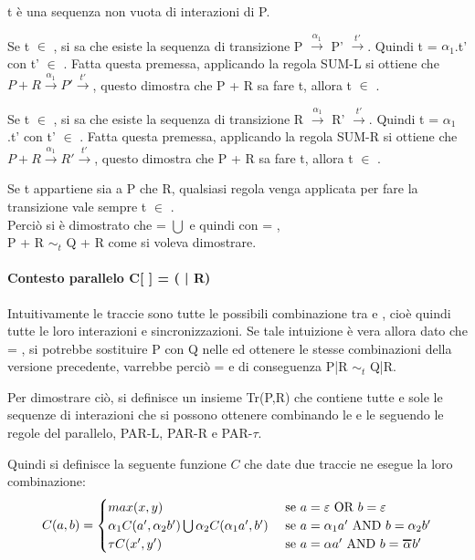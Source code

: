 t è una sequenza non vuota di interazioni di P.

Se t $\in$ , si sa che esiste la sequenza di transizione P $\overset{\alpha_{1}}\rightarrow$ P' $\overset{t'}\rightarrow$. Quindi t = $\alpha_{1}$.t' con t' $\in$ . Fatta questa premessa, applicando la regola SUM-L si ottiene che $P + R \overset{\alpha_{1}}\rightarrow P'\overset{t'}\rightarrow$, questo dimostra che P + R sa fare t, allora t $\in$ .

Se t $\in$ , si sa che esiste la sequenza di transizione R $\overset{\alpha_{1}}\rightarrow$ R' $\overset{t'}\rightarrow$. Quindi t = $\alpha_{1}$.t' con t' $\in$ . Fatta questa premessa, applicando la regola SUM-R si ottiene che $P + R \overset{\alpha_{1}}\rightarrow R'\overset{t'}\rightarrow$, questo dimostra che P + R sa fare t, allora t $\in$ .

Se t appartiene sia a P che R, qualsiasi regola venga applicata per fare la transizione vale sempre t $\in$ .\\

Perciò si è dimostrato che  =  $\bigcup$  e quindi con  = ,\\ P + R $\sim_{t}$ Q + R come si voleva dimostrare.

\paragraph{Contesto parallelo  C[ ] = (\hspace{0.3cm} | R)} \mbox{}

Intuitivamente le traccie  sono tutte le possibili combinazione tra  e , cioè quindi tutte le loro interazioni e sincronizzazioni. Se tale intuizione è vera allora dato che  = , si potrebbe sostituire P con Q nelle  ed ottenere le stesse combinazioni della versione precedente, varrebbe perciò  =  e di conseguenza P|R $\sim_{t}$ Q|R.

Per dimostrare ciò, si definisce un insieme Tr(P,R) che contiene tutte e sole le sequenze di interazioni che si possono ottenere combinando le  e le  seguendo le regole del parallelo, PAR-L, PAR-R e PAR-$\tau$.

Quindi si definisce la seguente funzione $C$ che date due traccie ne esegue la loro combinazione:
\[
	C(a,b) = 
	\begin{cases}
	max(x,y) &  $ se $ a = \varepsilon $ OR $ b = \varepsilon\\
	\alpha_{1}C(a', \alpha_{2}b')\bigcup\alpha_{2}C(\alpha_{1}a', b') & $ se $ a = \alpha_{1}a' $ AND $ b = \alpha_{2}b'\\
	\tau C(x',y') & $ se $ a = \alpha a' $ AND $ b = \Overline[1pt]{\alpha} b'\\
	\end{cases}
\]

